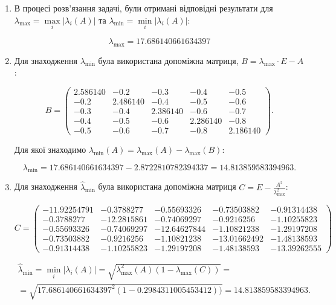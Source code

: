 \documentclass[12pt, a4paper]{article}
\theoremstyle{definition}
\newcommand{\Min}{\displaystyle\min\limits}
\newcommand{\Max}{\displaystyle\max\limits}
\numberwithin{equation}{section}
\begin{document}
\begin{enumerate}

	\item В процесі розв'язання задачі, були отримані відповідні результати для $\lambda_{\max} = \Max_i |\lambda_i(A)|$ та $\lambda_{\min} = \Min_i |\lambda_i(A)|$:

		\[\lambda_{\max} = 17.686140661634397 \]

	\item Для знаходження $\lambda_{\min}$ була використана допоміжна матриця, $B = \lambda_{\max} \cdot E - A$:

	\[ B = \begin{pmatrix} 2.586140 & -0.2 & -0.3 & -0.4 & -0.5 \\ -0.2 & 2.486140 & -0.4 & -0.5 & -0.6 \\ -0.3 & -0.4 & 2.386140 & -0.6 & -0.7 \\ -0.4 & -0.5 & -0.6 & 2.286140 & -0.8 \\ -0.5 & -0.6 & -0.7 & -0.8 & 2.186140 \end{pmatrix}. \]

	Для якої знаходимо $\lambda_{\min}(A) = \lambda_{\max}(A) - \lambda_{\max}(B)$:

		\[\lambda_{\min} = 17.686140661634397 - 2.8722810782394337 = 14.813859583394963. \]

	\item Для знаходження $\hat \lambda_{\min}$ була використана допоміжна матриця $C = E - \frac{A^2}{\lambda_{\max}^2	}$:

	\[ C = \begin{pmatrix} -11.92254791 & -0.3788277 & -0.55693326 & -0.73503882 & -0.91314438 \\ -0.3788277 & -12.2815861 & -0.74069297 & -0.9216256 & -1.10255823 \\ -0.55693326 & -0.74069297 & -12.64627844 & -1.10821238 & -1.29197208 \\ -0.73503882 & -0.9216256 & -1.10821238 & -13.01662492 & -1.48138593 \\ -0.91314438 & -1.10255823 & -1.29197208 & -1.48138593 & -13.39262555 \end{pmatrix}\]	

	\begin{multline*}\hat \lambda_{\min} = \Min_i |\lambda_i(A)| = \sqrt{\lambda_{\max}^2(A)(1-\lambda_{\max}(C))} = \\ =\sqrt{17.686140661634397^2(1-0.2984311005453412))}= 14.813859583394963. \end{multline*}

\end{enumerate}
\end{document}
